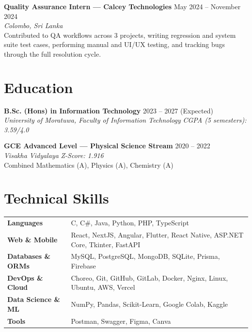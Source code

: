\documentclass[a4paper,10pt]{article}
\newcommand{\cvitem}[2]{\textbf{#1} \hfill #2 \\[-2pt]}
\begin{document}
\vspace{4pt}
\cvitem{Quality Assurance Intern --- Calcey Technologies}{May 2024 -- November 2024}
\textit{Colombo, Sri Lanka}\\[1pt]
Contributed to QA workflows across 3 projects, writing regression and system suite test cases, performing manual and UI/UX testing, and tracking bugs through the full resolution cycle.

\section{Education}
\vspace{2pt}

\cvitem{B.Sc. (Hons) in Information Technology}{2023 -- 2027 (Expected)}
\textit{University of Moratuwa, Faculty of Information Technology} \hfill \textit{CGPA (5 semesters): 3.59/4.0}

\vspace{3pt}
\cvitem{GCE Advanced Level --- Physical Science Stream}{2020 -- 2022}
\textit{Visakha Vidyalaya} \hfill \textit{Z-Score: 1.916} \\[-2pt]
{\small Combined Mathematics (A), Physics (A), Chemistry (A)}

\section{Technical Skills}
\vspace{2pt}

\begin{tabularx}{\textwidth}{@{} l X @{}}
  \textbf{Languages}       & C, C\#, Java, Python, PHP, TypeScript \\[1pt]
  \textbf{Web \& Mobile}   & React, NextJS, Angular, Flutter, React Native, ASP.NET Core, Tkinter, FastAPI \\[1pt]
  \textbf{Databases \& ORMs} & MySQL, PostgreSQL, MongoDB, SQLite, Prisma, Firebase \\[1pt]
  \textbf{DevOps \& Cloud} & Choreo, Git, GitHub, GitLab, Docker, Nginx, Linux, Ubuntu, AWS, Vercel \\[1pt]
  \textbf{Data Science \& ML} & NumPy, Pandas, Scikit-Learn, Google Colab, Kaggle \\[1pt]
  \textbf{Tools}           & Postman, Swagger, Figma, Canva \\
\end{tabularx}
\end{document}
